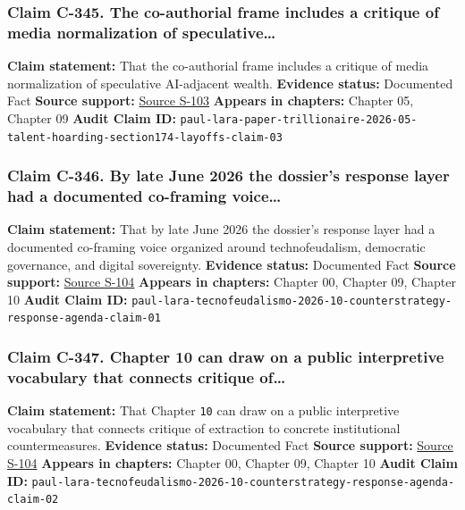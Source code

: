 \documentclass[
  american,
  11pt,
  letterpaper,
]{article}
\begin{document}
\subsubsection{Claim C-345. The co-authorial frame includes a critique
of media normalization of
speculative\ldots{}}\label{claim-c-345-the-co-authorial-frame-includes-a-critique-of-media-normalization-of-speculative}

\textbf{Claim statement:} That the co-authorial frame includes a
critique of media normalization of speculative AI-adjacent wealth.
\textbf{Evidence status:} Documented Fact \textbf{Source support:}
\hyperref[source-s-103-el-trillonario-de-papel]{Source S-103}
\textbf{Appears in chapters:} Chapter 05, Chapter 09 \textbf{Audit Claim
ID:}
\texttt{paul-lara-paper-trillionaire-2026-05-talent-hoarding-section174-layoffs-claim-03}

\subsubsection{Claim C-346. By late June 2026 the dossier's response
layer had a documented co-framing
voice\ldots{}}\label{claim-c-346-by-late-june-2026-the-dossier-s-response-layer-had-a-documented-co-framing-voice}

\textbf{Claim statement:} That by late June 2026 the dossier's response
layer had a documented co-framing voice organized around
technofeudalism, democratic governance, and digital sovereignty.
\textbf{Evidence status:} Documented Fact \textbf{Source support:}
\hyperref[source-s-104-c-mo-hackear-al-tecnofeudalismo]{Source S-104}
\textbf{Appears in chapters:} Chapter 00, Chapter 09, Chapter 10
\textbf{Audit Claim ID:}
\texttt{paul-lara-tecnofeudalismo-2026-10-counterstrategy-response-agenda-claim-01}

\subsubsection{Claim C-347. Chapter 10 can draw on a public interpretive
vocabulary that connects critique
of\ldots{}}\label{claim-c-347-chapter-10-can-draw-on-a-public-interpretive-vocabulary-that-connects-critique-of}

\textbf{Claim statement:} That Chapter \texttt{10} can draw on a public
interpretive vocabulary that connects critique of extraction to concrete
institutional countermeasures. \textbf{Evidence status:} Documented Fact
\textbf{Source support:}
\hyperref[source-s-104-c-mo-hackear-al-tecnofeudalismo]{Source S-104}
\textbf{Appears in chapters:} Chapter 00, Chapter 09, Chapter 10
\textbf{Audit Claim ID:}
\texttt{paul-lara-tecnofeudalismo-2026-10-counterstrategy-response-agenda-claim-02}
\end{document}
